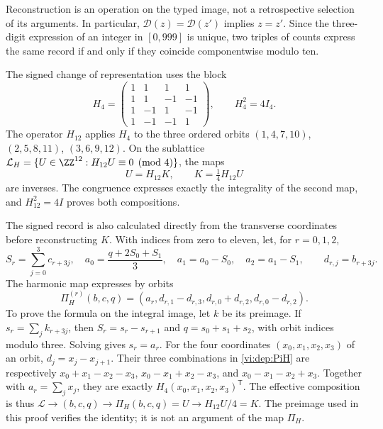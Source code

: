 Reconstruction is an operation on the typed image, not a
retrospective selection of its arguments. In particular,
\(\mathcal D(z)=\mathcal D(z')\) implies \(z=z'\).
Since the three-digit expression of an integer in \([0,999]\) is unique,
two triples of counts express the same record if and only if they coincide
componentwise modulo ten.

The signed change of representation uses the block
\begin{equation}
 H_4=\begin{pmatrix}
 1&1&1&1\\1&1&-1&-1\\
 1&-1&1&-1\\1&-1&-1&1
 \end{pmatrix},\qquad H_4^2=4I_4.
 \label{vi:dep:hadamard}
\end{equation}
The operator \(H_{12}\) applies \(H_4\) to the three ordered orbits
\((1,4,7,10)\), \((2,5,8,11)\), \((3,6,9,12)\).
On the sublattice
\(\mathcal L_H=\{U\in\ZZ^{12}:H_{12}U\equiv0\pmod4\}\),
the maps
\begin{equation}
 U=H_{12}K,\qquad K=\tfrac14H_{12}U
 \label{vi:dep:K-reversible}
\end{equation}
are inverses. The congruence expresses exactly the integrality of the
second map, and \(H_{12}^2=4I\) proves both compositions.

The signed record is also calculated directly from the transverse
coordinates before reconstructing \(K\). With indices from zero to eleven,
let, for \(r=0,1,2\),
\[
 S_r=\sum_{j=0}^3c_{r+3j},\quad
 a_0=\frac{q+2S_0+S_1}{3},\quad
 a_1=a_0-S_0,\quad a_2=a_1-S_1,
 \qquad d_{r,j}=b_{r+3j}.
\]
The harmonic map expresses by orbits
\begin{equation}
 \Pi_H^{(r)}(b,c,q)=
 (a_r,d_{r,1}-d_{r,3},d_{r,0}+d_{r,2},d_{r,0}-d_{r,2}).
 \label{vi:dep:PiH}
\end{equation}
To prove the formula on the integral image, let \(k\) be its
preimage. If \(s_r=\sum_jk_{r+3j}\), then
\(S_r=s_r-s_{r+1}\) and \(q=s_0+s_1+s_2\), with orbit indices
modulo three. Solving gives \(s_r=a_r\). For the four coordinates
\((x_0,x_1,x_2,x_3)\) of an orbit,
\(d_j=x_j-x_{j+1}\). Their three combinations in
\eqref{vi:dep:PiH} are respectively
\(x_0+x_1-x_2-x_3\), \(x_0-x_1+x_2-x_3\), and
\(x_0-x_1-x_2+x_3\). Together with \(a_r=\sum_jx_j\), they are
exactly \(H_4(x_0,x_1,x_2,x_3)^{\mathsf T}\).
The effective composition is thus
\(\mathscr L\to(b,c,q)\to\Pi_H(b,c,q)=U\to H_{12}U/4=K\).
The preimage used in this proof verifies the identity;
it is not an argument of the map \(\Pi_H\).

